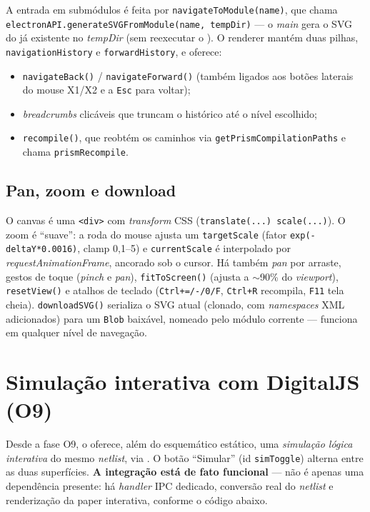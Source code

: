 A entrada em submódulos é feita por \lstinline|navigateToModule(name)|, que chama
\lstinline|electronAPI.generateSVGFromModule(name, tempDir)| --- o \emph{main}
gera o SVG do  já existente no \emph{tempDir} (sem reexecutar
o ). O renderer mantém duas pilhas, \lstinline|navigationHistory| e
\lstinline|forwardHistory|, e oferece:

\begin{itemize}[leftmargin=1.4em]
  \item \lstinline|navigateBack()| / \lstinline|navigateForward()| (também ligados
        aos botões laterais do mouse X1/X2 e a \lstinline|Esc| para voltar);
  \item \emph{breadcrumbs} clicáveis que truncam o histórico até o nível
        escolhido;
  \item \lstinline|recompile()|, que reobtém os caminhos via
        \lstinline|getPrismCompilationPaths| e chama
        \lstinline|prismRecompile|.
\end{itemize}

\subsection{Pan, zoom e download}

O canvas é uma \lstinline|<div>| com \emph{transform} CSS
(\lstinline|translate(...) scale(...)|). O zoom é \enquote{suave}: a roda do mouse
ajusta um \lstinline|targetScale| (fator \lstinline|exp(-deltaY*0.0016)|, clamp
0{,}1--5) e \lstinline|currentScale| é interpolado por \emph{requestAnimationFrame},
ancorado sob o cursor. Há também \emph{pan} por arraste, gestos de toque
(\emph{pinch} e \emph{pan}), \lstinline|fitToScreen()| (ajusta a $\sim$90\% do
\emph{viewport}), \lstinline|resetView()| e atalhos de teclado
(\lstinline|Ctrl+=/-/0/F|, \lstinline|Ctrl+R| recompila, \lstinline|F11| tela
cheia). \lstinline|downloadSVG()| serializa o SVG atual (clonado, com
\emph{namespaces} XML adicionados) para um \lstinline|Blob| baixável, nomeado pelo
módulo corrente --- funciona em qualquer nível de navegação.

\section{Simulação interativa com DigitalJS (O9)}
\label{sec:digitaljs}

Desde a fase O9, o  oferece, além do esquemático estático, uma
\emph{simulação lógica interativa} do mesmo \emph{netlist}, via .
O botão \enquote{Simular} (id \lstinline|simToggle|) alterna entre as duas
superfícies. \textbf{A integração está de fato funcional} --- não é apenas uma
dependência presente: há \emph{handler} IPC dedicado, conversão real do
\emph{netlist} e renderização da paper interativa, conforme o código abaixo.

